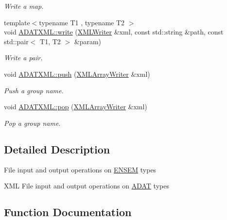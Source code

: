 \begin{DoxyCompactItemize}
\begin{DoxyCompactList}\small\item\em Write a map. \end{DoxyCompactList}\item 
{\footnotesize template$<$typename T1 , typename T2 $>$ }\\void \mbox{\hyperlink{group__io_gabcda0d5bebd682903ae663861766df8b}{A\+D\+A\+T\+X\+M\+L\+::write}} (\mbox{\hyperlink{classADATXML_1_1XMLWriter}{X\+M\+L\+Writer}} \&xml, const std\+::string \&path, const std\+::pair$<$ T1, T2 $>$ \&param)
\begin{DoxyCompactList}\small\item\em Write a pair. \end{DoxyCompactList}\item 
void \mbox{\hyperlink{group__io_ga957f4130fa008139cd16879b0794ae54}{A\+D\+A\+T\+X\+M\+L\+::push}} (\mbox{\hyperlink{classADATXML_1_1XMLArrayWriter}{X\+M\+L\+Array\+Writer}} \&xml)
\begin{DoxyCompactList}\small\item\em Push a group name. \end{DoxyCompactList}\item 
void \mbox{\hyperlink{group__io_gafc9d3fe6a9094c09371a9213eb4b6cdd}{A\+D\+A\+T\+X\+M\+L\+::pop}} (\mbox{\hyperlink{classADATXML_1_1XMLArrayWriter}{X\+M\+L\+Array\+Writer}} \&xml)
\begin{DoxyCompactList}\small\item\em Pop a group name. \end{DoxyCompactList}\end{DoxyCompactItemize}


\subsection{Detailed Description}
File input and output operations on \mbox{\hyperlink{namespaceENSEM}{E\+N\+S\+EM}} types

X\+ML File input and output operations on \mbox{\hyperlink{namespaceADAT}{A\+D\+AT}} types 

\subsection{Function Documentation}
\mbox{\label{group__io_ga30a170c6f2ec820ececb3d3525e2ffa6}} 
